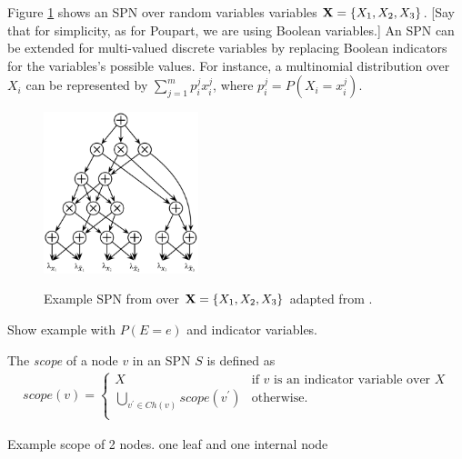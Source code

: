 %
%

Figure \ref{fig:spn} shows an SPN over random variables variables ${\bf X}=\{X_1,X_2,X_3\}$.
[Say that for simplicity, as for Poupart, we are using Boolean variables.]
An SPN can be extended for multi-valued discrete variables by replacing Boolean indicators for the variables's possible values.
For instance, a multinomial distribution over $X_i$ can be represented by $\sum_{j=1}^{m}{p^j_i x^j_i}$, where $p^j_i = P(X_i = x^j_i)$.


\begin{figure}[h]
    \begin{center}
		\includegraphics[width=0.4\textwidth]{figures/SPN.png}
		\caption{Example SPN from over ${\bf X}=\{X_1,X_2,X_3\}$ adapted from \cite{Peharz:2016wl}.}
		\label{subfig:dag}
    \label{fig:spn}
    \end{center}
\end{figure}

\begin{example}
Show example with $P(E=e)$ and indicator variables.	
\end{example}

The \emph{scope} of a node $v$ in an SPN $S$ is defined as
\begin{align*}
scope(v) = \begin{cases}
				X & \text{if $v$ is an indicator variable over $X$}\\
				\bigcup_{v^\prime \in Ch(v)}{scope(v^\prime)} &\text{otherwise.}\\
			\end{cases}
\end{align*}

\begin{example}
	Example scope of 2 nodes. one leaf and one internal node
\end{example}

